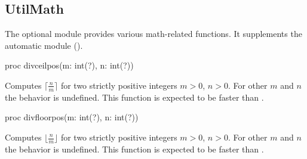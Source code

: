 \subsection{UtilMath}
\label{StdModules_UtilMath}

The optional module  provides various math-related functions.
It supplements the automatic  module ().

\begin{protohead}
proc divceilpos(m: int(?), n: int(?))
\end{protohead}
\begin{protobody}
Computes
$\lceil\frac{n}{m}\rceil$
for two strictly positive integers $m>0$, $n>0$.
For other $m$ and $n$ the behavior is undefined.
This function is expected to be faster than .
\end{protobody}

\begin{protohead}
proc divfloorpos(m: int(?), n: int(?))
\end{protohead}
\begin{protobody}
Computes
$\lfloor\frac{n}{m}\rfloor$
for two strictly positive integers $m>0$, $n>0$.
For other $m$ and $n$ the behavior is undefined.
This function is expected to be faster than .
\end{protobody}


